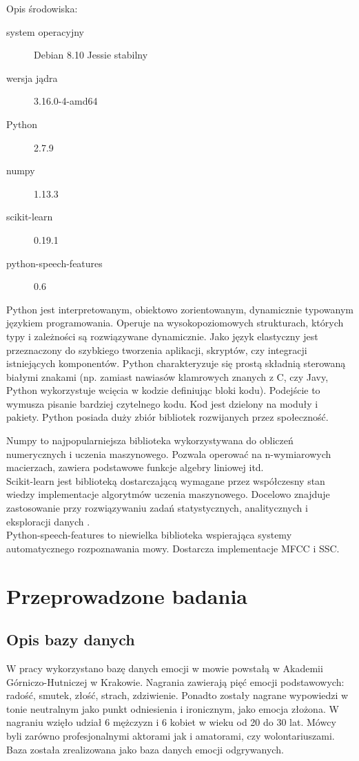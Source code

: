\documentclass[a4paper,12pt,twoside,openany]{report}
\begin{document}
Opis środowiska:
\begin{description}
	\item [system operacyjny] Debian 8.10 Jessie stabilny 
	\item [wersja jądra] 3.16.0-4-amd64
	\item [Python] 2.7.9
	\item [numpy] 1.13.3
	\item [scikit-learn] 0.19.1
	\item [python-speech-features] 0.6
\end{description}
Python jest interpretowanym, obiektowo zorientowanym, dynamicznie typowanym językiem programowania.
Operuje na wysokopoziomowych strukturach, których typy i zależności są rozwiązywane dynamicznie.
Jako język elastyczny jest przeznaczony do szybkiego tworzenia aplikacji, skryptów, czy integracji istniejących komponentów.
Python charakteryzuje się prostą składnią sterowaną białymi znakami 
(np. zamiast nawiasów klamrowych znanych z C, czy Javy, Python wykorzystuje wcięcia w kodzie definiując bloki kodu).
Podejście to wymusza pisanie bardziej czytelnego kodu.
Kod jest dzielony na moduły i pakiety.
Python posiada duży zbiór bibliotek rozwijanych przez społeczność.

Numpy to najpopularniejsza biblioteka wykorzystywana do obliczeń numerycznych i uczenia maszynowego.
Pozwala operować na n-wymiarowych macierzach, zawiera podstawowe funkcje algebry liniowej itd.
\\
Scikit-learn jest biblioteką dostarczającą wymagane przez współczesny stan wiedzy implementacje algorytmów uczenia maszynowego.
Docelowo znajduje zastosowanie przy rozwiązywaniu zadań statystycznych, analitycznych i eksploracji danych \cite{OShaughnessy2008}.  
\\
Python-speech-features to niewielka biblioteka wspierająca systemy automatycznego rozpoznawania mowy. 
Dostarcza implementacje MFCC i SSC.
\chapter{Przeprowadzone badania}
\section{Opis bazy danych}\label{sec:opis_bazy_danych}
W pracy wykorzystano bazę danych emocji w mowie powstałą w Akademii Górniczo-Hutniczej w Krakowie.
Nagrania zawierają pięć emocji podstawowych: radość, smutek, złość, strach, zdziwienie.
Ponadto zostały nagrane wypowiedzi w tonie neutralnym jako punkt odniesienia i ironicznym, jako emocja złożona.
W nagraniu wzięło udział 6 mężczyzn i 6 kobiet w wieku od 20 do 30 lat. 
Mówcy byli zarówno profesjonalnymi aktorami jak i amatorami, czy wolontariuszami.
Baza została zrealizowana jako baza danych emocji odgrywanych. 
\end{document}

